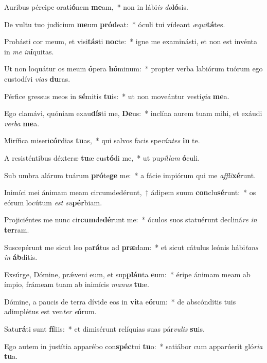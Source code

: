 \item Auribus pércipe orati\textbf{ó}nem \textbf{me}am,~* non in lábi\textit{is} \textit{do}\textbf{ló}sis.
\item De vultu tuo judícium \textbf{me}um \textbf{pród}eat:~* óculi tui vídeant \textit{æ}\textit{qui}\textbf{tá}tes.
\item Probásti cor meum, et visi\textbf{tás}ti \textbf{noc}te:~* igne me examinásti, et non est invénta in \textit{me} \textit{in}\textbf{í}quitas.
\item Ut non loquátur os meum \textbf{ó}pera \textbf{hó}minum:~* propter verba labiórum tuórum ego custodívi \textit{vi}\textit{as} \textbf{du}ras.
\item Pérfice gressus meos in \textbf{sé}mitis \textbf{tu}is:~* ut non moveántur vestí\textit{gi}\textit{a} \textbf{me}a.
\item Ego clamávi, quóniam exau\textbf{dís}ti me, \textbf{De}us:~* inclína aurem tuam mihi, et exáudi \textit{ver}\textit{ba} \textbf{me}a.
\item Mirífica miseri\textbf{cór}dias \textbf{tu}as,~* qui salvos facis spe\textit{rán}\textit{tes} \textbf{in} te.
\item A resisténtibus déxteræ \textbf{tu}æ cus\textbf{tó}di me,~* ut pu\textit{píl}\textit{lam} \textbf{ó}culi.
\item Sub umbra alárum tuárum \textbf{pró}te\textbf{ge} me:~* a fácie impiórum qui me \textit{af}\textit{fli}\textbf{xé}runt.
\item Inimíci mei ánimam meam circumdedérunt,~† ádipem suum \textbf{con}clu\textbf{sé}runt:~* os eórum locútum \textit{est} \textit{su}\textbf{pér}biam.
\item Projiciéntes me nunc cir\textbf{cum}de\textbf{dé}runt me:~* óculos suos statuérunt decliná\textit{re} \textit{in} \textbf{ter}ram.
\item Suscepérunt me sicut leo pa\textbf{rá}tus ad \textbf{præ}dam:~* et sicut cátulus leónis hábi\textit{tans} \textit{in} \textbf{áb}ditis.
\item Exsúrge, Dómine, prǽveni eum, et sup\textbf{plán}ta \textbf{e}um:~* éripe ánimam meam ab ímpio, frámeam tuam ab inimícis \textit{ma}\textit{nus} \textbf{tu}æ.
\item Dómine, a paucis de terra dívide eos in \textbf{vi}ta e\textbf{ó}rum:~* de abscónditis tuis adimplétus est ven\textit{ter} \textit{e}\textbf{ó}rum.
\item Satu\textbf{rá}ti sunt \textbf{fí}liis:~* et dimisérunt relíquias suas pár\textit{vu}\textit{lis} \textbf{su}is.
\item Ego autem in justítia apparébo con\textbf{spéc}tui \textbf{tu}o:~* satiábor cum apparúerit gló\textit{ri}\textit{a} \textbf{tu}a.

